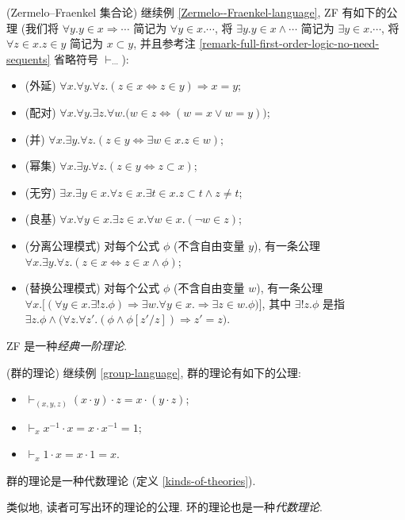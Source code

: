 \begin{example}
	{(Zermelo--Fraenkel 集合论)}
	继续例 \ref{Zermelo--Fraenkel-language}, ZF 有如下的公理 (我们将 $\forall y.y\in x\Rightarrow\cdots$ 简记为 $\forall y\in x.\cdots$, 将 $\exists y.y\in x\land\cdots$ 简记为 $\exists y\in x.\cdots$, 将 $\forall z\in x.z\in y$ 简记为 $x\subset y$, 并且参考注 \ref{remark-full-first-order-logic-no-need-sequents} 省略符号 $\vdash_{\cdots}$):
	\begin{itemize}
		\item (外延) $\forall x.\forall y.\forall z. (z\in x  \Leftrightarrow z\in y) \Rightarrow x=y$;
		\item (配对) $\forall x.\forall y.\exists z.\forall w.\big(w\in z \Leftrightarrow (w=x \lor w=y)\big)$;
		\item (并) $\forall x.\exists y.\forall z. (z\in y \Leftrightarrow \exists w\in x. z\in w)$;
		\item (幂集) $\forall x.\exists y.\forall z. (z\in y \Leftrightarrow z\subset x)$;
		\item (无穷) $\exists x.\exists y\in x.\forall z\in x.\exists t\in x.z\subset t\land z\neq t$;
		\item (良基) $\forall x. \forall y\in x. \exists z\in x. \forall w\in x.(\neg w\in z)$;
		\item (分离公理模式) 对每个公式 $\phi$ (不含自由变量 $y$), 有一条公理 $\forall x.\exists y.\forall z. (z\in x\Leftrightarrow z\in x\land \phi)$;
		\item (替换公理模式) 对每个公式 $\phi$ (不含自由变量 $w$), 有一条公理 $\forall x.\big[(\forall y\in x.\exists ! z. \phi)
		\Rightarrow \exists w.\forall y\in x. \Rightarrow \exists z\in w.\phi)\big]$, 其中 $\exists ! z.\phi$ 是指 $\exists z.\phi \land\big( \forall z.\forall z'. (\phi\land\phi[z'/z])\Rightarrow z'=z\big)$.
	\end{itemize}
	ZF 是一种\emph{经典一阶理论}.
\end{example}

\begin{example}
	[label={theory-of-groups}]
	{(群的理论)}
	继续例 \ref{group-language}, 群的理论有如下的公理:
	\begin{itemize}
		\item $\vdash_{(x,y,z)}(x\cdot y)\cdot z = x\cdot (y\cdot z)$;
		\item $\vdash_x x^{-1}\cdot x = x\cdot x^{-1} = 1$;
		\item $\vdash_x 1\cdot x = x\cdot 1 = x$.
	\end{itemize}
	群的理论是一种代数理论 (定义 \ref{kinds-of-theories}).
	
	类似地, 读者可写出环的理论的公理. 环的理论也是一种\emph{代数理论}.
\end{example}

